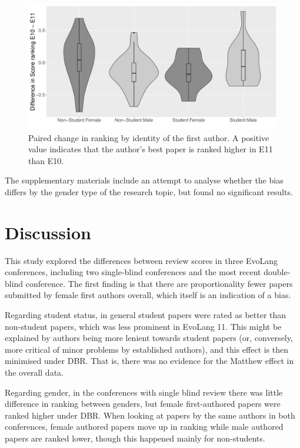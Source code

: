 \documentclass[12pt]{article}
\begin{document}
\begin{figure}[htbp]
\begin{center}
\includegraphics[width=130mm]{../Improvement.pdf}
\caption{Paired change in ranking by identity of the first author.  A positive value indicates that the author's best paper is ranked higher in E11 than E10.}
\label{fig:imp}
\end{center}
\end{figure}

The supplementary materials include an attempt to analyse whether the bias differs by the gender type of the research topic, but found no significant results.

\section{Discussion}

This study explored the differences between review scores in three EvoLang conferences, including two single-blind conferences and the most recent double-blind conference.  The first finding is that there are proportionality fewer papers submitted by female first authors overall, which itself is an indication of a bias.

Regarding student status, in general student papers were rated as better than non-student papers, which was less prominent in EvoLang 11.  This might be explained by authors being more lenient towards student papers (or, conversely, more critical of minor problems by established authors), and this effect is then minimised under DBR.  That is, there was no evidence for the Matthew effect in the overall data.

Regarding gender, in the conferences with single blind review there was little difference in ranking between genders, but female first-authored papers were ranked higher under DBR.  When looking at papers by the same authors in both conferences, female authored papers move up in ranking while male authored papers are ranked lower, though this happened mainly for non-students.
\end{document}
